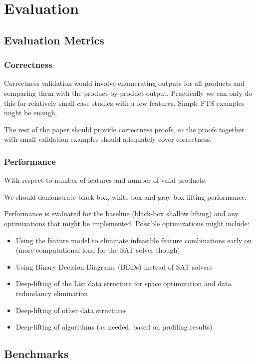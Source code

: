 \documentclass[12pt]{article}
\begin{document}
\section{Evaluation}

\subsection{Evaluation Metrics}
\subsubsection{Correctness}
Correctness validation would involve enumerating outputs for all products and comparing them with the product-by-product output. Practically we can only do this for relatively small case studies with a few features. Simple FTS examples might be enough.

The rest of the paper should provide correctness proofs, so the proofs together with small validation examples should adequately cover correctness. 

\subsubsection{Performance}
With respect to number of features and number of valid products.

We should demonstrate black-box, white-box and gray-box lifting performance.

Performance is evaluated for the baseline (black-box shallow lifting) and any optimizations that might be implemented. Possible optimizations might include:
\begin{itemize}
	\item Using the feature model to eliminate infeasible feature combinations early on (more computational load for the SAT solver though)
	\item Using Binary Decision Diagrams (BDDs) instead of SAT solvers
	\item Deep-lifting of the List data structure for space optimization and data redundancy elimination
	\item Deep-lifting of other data structures
	\item Deep-lifting of algorithms (as needed, based on profiling results)
\end{itemize}

\subsection{Benchmarks}
\end{document}
